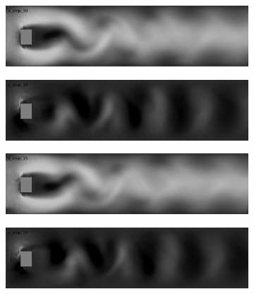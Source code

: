 \documentclass{llncs}
\begin{document}
\begin{figure}[H]
  \begin{subfigure}{.5\textwidth}
    \centering
    \includegraphics[width=1\linewidth]{imgs/sims/constant/x_step_10}
  \end{subfigure}
  \begin{subfigure}{.5\textwidth}
    \centering
    \includegraphics[width=1\linewidth]{imgs/sims/constant/y_step_10}
  \end{subfigure}

  \begin{subfigure}{.5\textwidth}
    \centering
    \includegraphics[width=1\linewidth]{imgs/sims/constant/x_step_15}
  \end{subfigure}
  \begin{subfigure}{.5\textwidth}
    \centering
    \includegraphics[width=1\linewidth]{imgs/sims/constant/y_step_15}
  \end{subfigure}


\end{figure}
\end{document}
